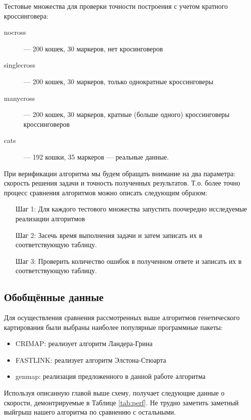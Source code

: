 \documentclass{matmex-diploma-custom}
\begin{document}
Тестовые множества для проверки точности построения с учетом кратного
кроссинговера:
\begin{description}
\item[nocross] --- 200 кошек, 30 маркеров, нет кросинговеров
\item[singlecross] --- 200 кошек, 30 маркеров, только однократные кроссинговеры
\item[manycross] --- 200 кошек, 30 маркеров, кратные (больше одного)
  кроссинговеры кроссинговеров
\item[cats] --- 192 кошки, 35 маркеров --- реальные данные.
\end{description}

При верификации алгоритма мы будем обращать внимание на два параметра:
скорость решения задачи и точность полученных результатов. Т.о. более
точно процесс сравнения алгоритмов можно описать следующим образом:

\begin{enumerate}
\item[Шаг 1:] Для каждого тестового множества запустить поочередно
  исследуемые реализации алгоритмов
\item[Шаг 2:] Засечь время выполнения задачи и затем записать их в
  соответствующую таблицу.
\item[Шаг 3:] Проверить количество ошибок в полученном ответе и
  записать их в соответствующую таблицу.
\end{enumerate}

\subsection{Обобщённые данные}

Для осуществления сравнения рассмотренных выше алгоритмов
генетического картирования были выбраны наиболее популярные
программные пакеты:

\begin{itemize}
\item CRIMAP: реализует алгоритм Ландера-Грина
\item FASTLINK: реализует алгоритм Элстона-Стюарта
\item genmap: реализация предложенного в данной работе алгоритма
\end{itemize}

Используя описанную главой выше схему, получает следующие данные о
скорости, демонтрируемые в Таблице \ref{tab:perf}. Не трудно заметить
заметный выйгрыш нашего алгоритма по сравнению с остальными.
\end{document}
